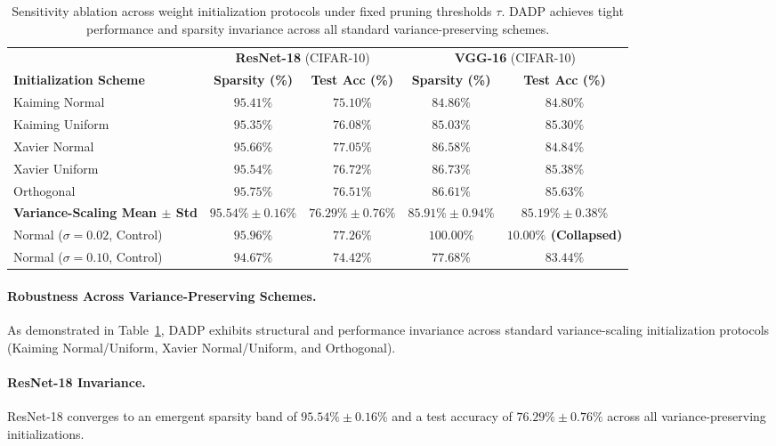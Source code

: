 \begin{table}[ht]
\caption{Sensitivity ablation across weight initialization protocols under fixed pruning thresholds $\tau$. DADP achieves tight performance and sparsity invariance across all standard variance-preserving schemes.}
\label{tab:init_ablation}
\centering
\small
\begin{tabular}{lcccc}
\toprule
& \multicolumn{2}{c}{\textbf{ResNet-18} (CIFAR-10)} & \multicolumn{2}{c}{\textbf{VGG-16} (CIFAR-10)} \\
\cmidrule(r){2-3} \cmidrule(l){4-5}
\textbf{Initialization Scheme} & \textbf{Sparsity (\%)} & \textbf{Test Acc (\%)} & \textbf{Sparsity (\%)} & \textbf{Test Acc (\%)} \\
\midrule
Kaiming Normal & $95.41\%$ & $75.10\%$ & $84.86\%$ & $84.80\%$ \\
Kaiming Uniform & $95.35\%$ & $76.08\%$ & $85.03\%$ & $85.30\%$ \\
Xavier Normal & $95.66\%$ & $77.05\%$ & $86.58\%$ & $84.84\%$ \\
Xavier Uniform & $95.54\%$ & $76.72\%$ & $86.73\%$ & $85.38\%$ \\
Orthogonal & $95.75\%$ & $76.51\%$ & $86.61\%$ & $85.63\%$ \\
\cmidrule{1-5}
\textbf{Variance-Scaling Mean $\pm$ Std} & \textbf{$95.54\% \pm 0.16\%$} & \textbf{$76.29\% \pm 0.76\%$} & \textbf{$85.91\% \pm 0.94\%$} & \textbf{$85.19\% \pm 0.38\%$} \\
\midrule
Normal ($\sigma = 0.02$, Control) & $95.96\%$ & $77.26\%$ & \textbf{$100.00\%$} & \textbf{$10.00\%$ (Collapsed)} \\
Normal ($\sigma = 0.10$, Control) & $94.67\%$ & $74.42\%$ & $77.68\%$ & $83.44\%$ \\
\bottomrule
\end{tabular}
\end{table}

\paragraph{Robustness Across Variance-Preserving Schemes.}
As demonstrated in Table~\ref{tab:init_ablation}, DADP exhibits structural and performance invariance across standard variance-scaling initialization protocols (Kaiming Normal/Uniform, Xavier Normal/Uniform, and Orthogonal). 

\paragraph{ResNet-18 Invariance.} ResNet-18 converges to an emergent sparsity band of $95.54\% \pm 0.16\%$ and a test accuracy of $76.29\% \pm 0.76\%$ across all variance-preserving initializations.

